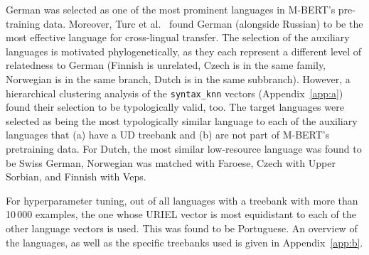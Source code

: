 	German was selected as one of the most prominent languages in M-BERT's pre-training data. Moreover, Turc et al.~\cite{turc-etal-2021-revisiting} found German (alongside Russian) to be the most effective language for cross-lingual transfer. The selection of the auxiliary languages is motivated phylogenetically, as they each represent a different level of relatedness to German (Finnish is unrelated, Czech is in the same family, Norwegian is in the same branch, Dutch is in the same subbranch). However, a hierarchical clustering analysis of the \texttt{syntax\_knn} vectors (Appendix~\ref{app:a}) found their selection to be typologically valid, too. The target languages were selected as being the most typologically similar language to each of the auxiliary languages that (a) have a UD treebank and (b) are not part of M-BERT's pretraining data. For Dutch, the most similar low-resource language was found to be Swiss German, Norwegian was matched with Faroese, Czech with Upper Sorbian, and Finnish with Veps.

	For hyperparameter tuning, out of all languages with a treebank with more than 10\,000 examples, the one whose URIEL vector is most equidistant to each of the other language vectors is used. This was found to be Portuguese. An overview of the languages, as well as the specific treebanks used is given in Appendix~\ref{app:b}.



